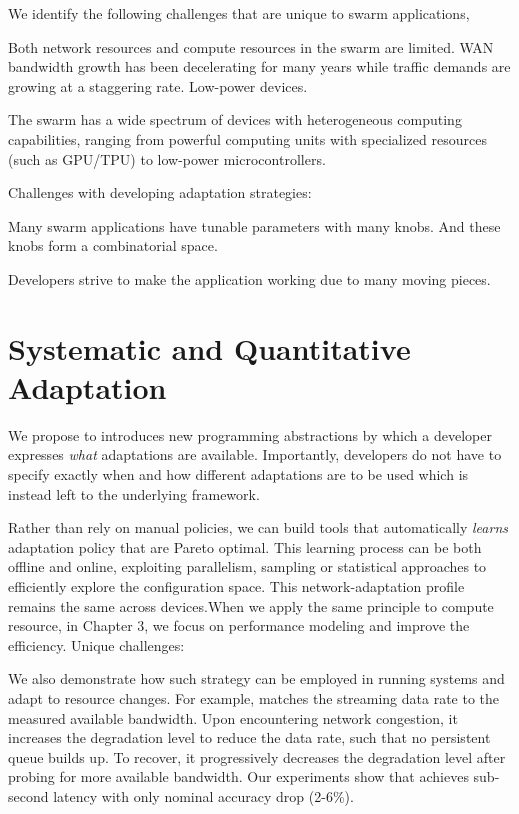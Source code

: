 \documentclass[thesis.tex]{subfiles}
\begin{document}
We identify the following challenges that are unique to swarm applications,

 Both network resources and compute resources in
the swarm are limited. WAN bandwidth growth has been decelerating for many years
while traffic demands are growing at a staggering rate. Low-power devices.

 The swarm has a wide spectrum of devices with
heterogeneous computing capabilities, ranging from powerful computing units with
specialized resources (such as GPU/TPU) to low-power microcontrollers.

Challenges with developing adaptation strategies:

 Many swarm applications have tunable parameters with
many knobs. And these knobs form a combinatorial space.

 Developers strive to make the
application working due to many moving pieces.

\section{Systematic and Quantitative Adaptation}
\label{sec:adaptation}


 We propose to introduces new programming
abstractions by which a developer expresses \emph{what} adaptations are
available. Importantly, developers do not have to specify exactly when and how
different adaptations are to be used which is instead left to the underlying
framework.

 Rather than rely on manual policies, we
can build tools that automatically \emph{learns} adaptation policy that are
Pareto optimal. This learning process can be both offline and online, exploiting
parallelism, sampling or statistical approaches to efficiently explore the
configuration space. This network-adaptation profile remains the same across
devices.When we apply the same principle to compute resource, in Chapter 3, we
focus on performance modeling and improve the efficiency. Unique challenges:

We also demonstrate how such strategy can be employed in running systems and
adapt to resource changes. For example, \sysname{} matches the streaming data
rate to the measured available bandwidth. Upon encountering network congestion,
it increases the degradation level to reduce the data rate, such that no
persistent queue builds up. To recover, it progressively decreases the
degradation level after probing for more available bandwidth. Our experiments
show that \sysname{} achieves sub-second latency with only nominal accuracy drop
(2-6\%).
\end{document}
